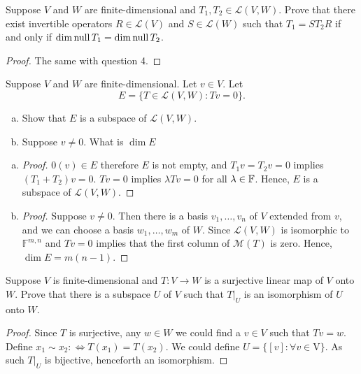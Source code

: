 \begin{exercise}
Suppose $V$ and $W$ are finite-dimensional and $T_1, T_2 \in \mathcal{L}(V,W)$. Prove that there exist invertible operators $R \in \mathcal{L}(V)$ and $S \in \mathcal{L}(W)$ such that $T_1 = ST_2R $ if and only if $\operatorname{dim}\mathop{\mathrm{null}} T_1 = \operatorname{dim}\mathop{\mathrm{null}} T_2$.
\end{exercise}
\begin{proof}
	The same with question 4.
\end{proof}

\begin{exercise}
Suppose $V$ and $W$ are finite-dimensional. Let $v \in V$. Let \[
	E = \{T \in \mathcal{L}(V,W) : Tv = 0\}.\]
\begin{enumerate}[(a)]
	\item Show that $E$ is a subspace of $\mathcal{L}(V,W)$.
	\item Suppose $v \neq 0.$ What is $\operatorname{dim} E$
\end{enumerate}
\end{exercise}
\begin{enumerate}[(a)]
	\item \begin{proof}
		      $0(v) \in E$ therefore $E$ is not empty, and $T_1v = T_2v = 0$ implies $(T_1 + T_2)v = 0$. $Tv = 0$ implies $\lambda Tv = 0$ for all $\lambda \in \mathbb{F}$. Hence, $E$ is a subspace of $\mathcal{L}(V,W)$.
	      \end{proof}
	\item \begin{proof}
		      Suppose $v \neq 0$. Then there is a basis $v_1, \ldots ,v_n$ of $V$ extended from $v$, and we can choose a basis $w_1, \ldots, w_m$ of $W$. Since $\mathcal{L}(V,W)$ is isomorphic to $\mathbb{F}^{m,n}$ and $Tv = 0$ implies that the first column of $\mathcal{M}(T)$ is zero. Hence, $\operatorname{dim} E = m(n-1)$.
	      \end{proof}
\end{enumerate}

\newpage

\begin{exercise}
Suppose $V$ is finite-dimensional and $T: V \to W$ is a surjective linear map of $V$ onto $W$. Prove that there is a subspace $U $ of $V $ such that $T|_U$ is an isomorphism of $U$ onto $W$.
\end{exercise}
\begin{proof}
	Since $T$ is surjective, any $w \in W$ we could find a $v \in V$ such that $Tv = w$. Define $x_1 \sim  x_2 :\iff T(x_1) = T(x_2)$. We could define $U = \{[v]: \forall v \in $V$\}$. As such $T|_U$ is bijective, henceforth an isomorphism.
\end{proof}

